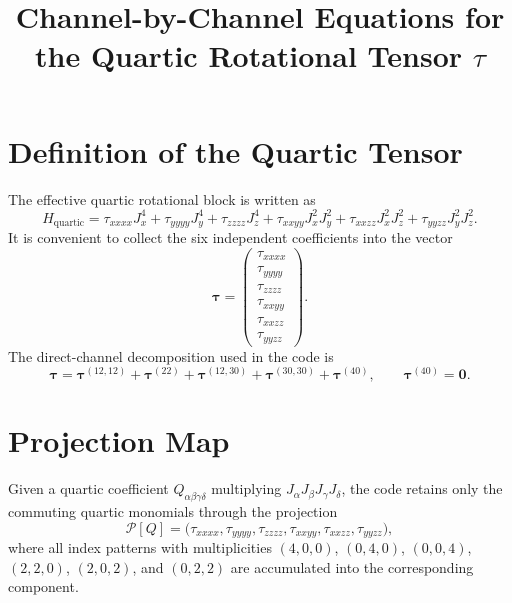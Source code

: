 \documentclass[11pt]{article}
\begin{document}
\title{Channel-by-Channel Equations for the Quartic Rotational Tensor $\tau$}
\author{}
\date{}
\maketitle

\section{Definition of the Quartic Tensor}
The effective quartic rotational block is written as
\begin{equation}
H_{\mathrm{quartic}} = \tau_{xxxx} J_x^4 + \tau_{yyyy} J_y^4 + \tau_{zzzz} J_z^4
+ \tau_{xxyy} J_x^2 J_y^2 + \tau_{xxzz} J_x^2 J_z^2 + \tau_{yyzz} J_y^2 J_z^2.
\end{equation}
It is convenient to collect the six independent coefficients into the vector
\begin{equation}
\bm{\tau} =
\begin{pmatrix}
\tau_{xxxx} \\
\tau_{yyyy} \\
\tau_{zzzz} \\
\tau_{xxyy} \\
\tau_{xxzz} \\
\tau_{yyzz}
\end{pmatrix}.
\end{equation}
The direct-channel decomposition used in the code is
\begin{equation}
\bm{\tau} =
\bm{\tau}^{(12,12)} +
\bm{\tau}^{(22)} +
\bm{\tau}^{(12,30)} +
\bm{\tau}^{(30,30)} +
\bm{\tau}^{(40)},
\qquad
\bm{\tau}^{(40)} = \bm{0}.
\end{equation}

\section{Projection Map}
Given a quartic coefficient $Q_{\alpha\beta\gamma\delta}$ multiplying
$J_\alpha J_\beta J_\gamma J_\delta$, the code retains only the commuting quartic
monomials through the projection
\begin{equation}
\mathcal{P}[Q] =
\bigl(\tau_{xxxx},\tau_{yyyy},\tau_{zzzz},\tau_{xxyy},\tau_{xxzz},\tau_{yyzz}\bigr),
\end{equation}
where all index patterns with multiplicities $(4,0,0)$, $(0,4,0)$, $(0,0,4)$,
$(2,2,0)$, $(2,0,2)$, and $(0,2,2)$ are accumulated into the corresponding
component.
\end{document}
